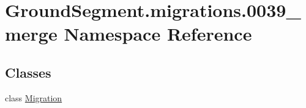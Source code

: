 \hypertarget{namespace_ground_segment_1_1migrations_1_10039__merge}{}\section{Ground\+Segment.\+migrations.0039\+\_\+merge Namespace Reference}
\label{namespace_ground_segment_1_1migrations_1_10039__merge}
\subsection*{Classes}
\begin{DoxyCompactItemize}
\item 
class \hyperlink{class_ground_segment_1_1migrations_1_10039__merge_1_1_migration}{Migration}
\end{DoxyCompactItemize}
